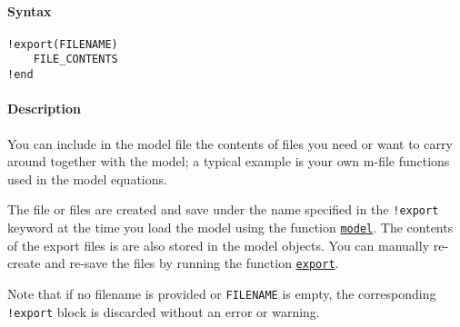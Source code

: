 


	\paragraph{Syntax}

\begin{verbatim}
!export(FILENAME)
    FILE_CONTENTS
!end
\end{verbatim}

\paragraph{Description}

You can include in the model file the contents of files you need or want
to carry around together with the model; a typical example is your own
m-file functions used in the model equations.

The file or files are created and save under the name specified in the
\texttt{!export} keyword at the time you load the model using the
function \href{model/model}{\texttt{model}}. The contents of the export
files is are also stored in the model objects. You can manually
re-create and re-save the files by running the function
\href{model/export}{\texttt{export}}.

Note that if no filename is provided or \texttt{FILENAME} is empty, the
corresponding \texttt{!export} block is discarded without an error or
warning.


